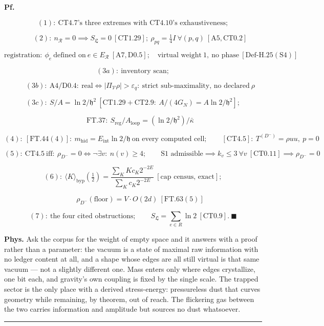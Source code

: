 \begin{theorem}
\textbf{Pf.}

\[
(1):\ \text{CT4.7's three extremes with CT4.10's exhaustiveness};
\]

\[
\qquad (2):\ n_{\mathcal R}=0\implies S_{\mathfrak L}=0\ [\mathrm{CT1.29}];\ \rho_{pq}=\tfrac14I\ \forall(p,q)\ [\mathrm{A5},\mathrm{CT0.2}]
\]

\[
\text{registration}:\ \phi_e\ \text{defined on}\ e\in E_{\mathcal R}\ [\mathrm{A7},\mathrm{D0.5}];\quad\text{virtual weight}\ 1,\ \text{no phase}\ [\mathrm{Def\text{-}H.25(S4)}]
\]

\[
(3a):\ \text{inventory scan};
\]

\[
\qquad (3b):\ \mathrm{A4}/\mathrm{D0.4}:\ \text{real}\iff|\Pi_{\mathcal V}\rho|>\varepsilon_q:\ \text{strict sub-maximality, no declared}\ \rho
\]

\[
(3c):\ S/A=\ln2/\mathfrak h^2\ [\mathrm{CT1.29}+\mathrm{CT2.9}:\ A/(4G_N)=A\ln2/\mathfrak h^2];
\]

\[
\qquad \text{FT.37}:\ S_{\mathrm{reg}}/A_{\mathrm{loop}}=(\ln2/\mathfrak h^2)/\bar\kappa
\]

\[
(4):\ [\mathrm{FT.44}(4)]:\ m_{\mathrm{hid}}=E_{\mathrm{int}}\ln2/\mathfrak h\ \text{on every computed cell};\qquad[\mathrm{CT4.5}]:\ T^{(D^-)}=\rho u u,\ p=0
\]

\[
(5):\ \mathrm{CT4.5}\ \text{iff}:\ \rho_{D^-}=0\iff\neg\exists v:\ n(v)\ge4;\qquad\text{S1 admissible}\implies k_v\le3\ \forall v\ [\mathrm{CT0.11}]\implies\rho_{D^-}=0
\]

\[
(6):\ \langle K\rangle_{\mathrm{byp}}(\tfrac12)=\frac{\sum_K Kc_K2^{-2E}}{\sum_Kc_K2^{-2E}}\ [\text{cap census, exact}];
\]

\[
\qquad \rho_{D^-}(\text{floor})=V\cdot O(2d)\ [\mathrm{FT.63}(5)]
\]

\[
(7):\ \text{the four cited obstructions};\qquad S_{\mathfrak L}=\sum_{e\in R}\ln2\ [\mathrm{CT0.9}].\ \blacksquare
\]

\textbf{Phys.} Ask the corpus for the weight of empty space and it answers with a proof rather than a parameter: the vacuum is a state of maximal raw information with no ledger content at all, and a shape whose edges are all still virtual is that same vacuum — not a slightly different one. Mass enters only where edges crystallize, one bit each, and gravity's own coupling is fixed by the single scale. The trapped sector is the only place with a derived stress-energy: pressureless dust that curves geometry while remaining, by theorem, out of reach. The flickering gas between the two carries information and amplitude but sources no dust whatsoever.

\vspace{2pt}\noindent\rule{\textwidth}{0.4pt}\vspace{2pt}

\end{theorem}

